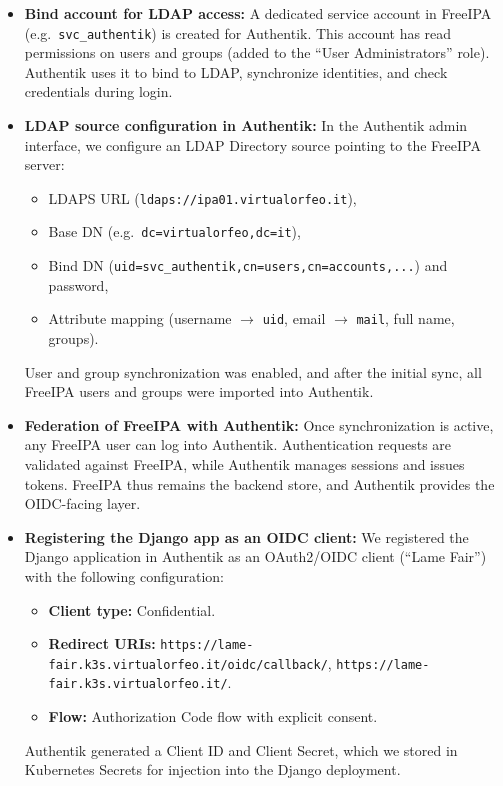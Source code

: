 \begin{itemize}
	\item \textbf{Bind account for LDAP access:}  
	A dedicated service account in FreeIPA (e.g.\ \texttt{svc\_authentik}) is 
	created for Authentik. This account has read permissions on users and groups 
	(added to the ``User Administrators'' role). Authentik uses it to bind to LDAP, 
	synchronize identities, and check credentials during login.  
	
	\item \textbf{LDAP source configuration in Authentik:}  
	In the Authentik admin interface, we configure an LDAP Directory source 
	pointing to the FreeIPA server:  
	\begin{itemize}
		\item LDAPS URL (\texttt{ldaps://ipa01.virtualorfeo.it}),  
		\item Base DN (e.g.\ \texttt{dc=virtualorfeo,dc=it}),  
		\item Bind DN (\texttt{uid=svc\_authentik,cn=users,cn=accounts,...}) and 
		password,  
		\item Attribute mapping (username $\rightarrow$ \texttt{uid}, email 
		$\rightarrow$ \texttt{mail}, full name, groups).  
	\end{itemize}
	User and group synchronization was enabled, and after the initial sync, all 
	FreeIPA users and groups were imported into Authentik.  
	
	\item \textbf{Federation of FreeIPA with Authentik:}  
	Once synchronization is active, any FreeIPA user can log into Authentik. 
	Authentication requests are validated against FreeIPA, while Authentik 
	manages sessions and issues tokens. FreeIPA thus remains the backend store, 
	and Authentik provides the OIDC-facing layer.  
	
	\item \textbf{Registering the Django app as an OIDC client:}  
	We registered the Django application in Authentik as an OAuth2/OIDC client 
	(``Lame Fair'') with the following configuration:  
	\begin{itemize}
		\item \textbf{Client type:} Confidential.  
		\item \textbf{Redirect URIs:}  
		\texttt{https://lame-fair.k3s.virtualorfeo.it/oidc/callback/},  
		\texttt{https://lame-fair.k3s.virtualorfeo.it/}.  
		\item \textbf{Flow:} Authorization Code flow with explicit consent.  
	\end{itemize}
	Authentik generated a Client ID and Client Secret, which we stored in 
	Kubernetes Secrets for injection into the Django deployment.  
	

\end{itemize}

